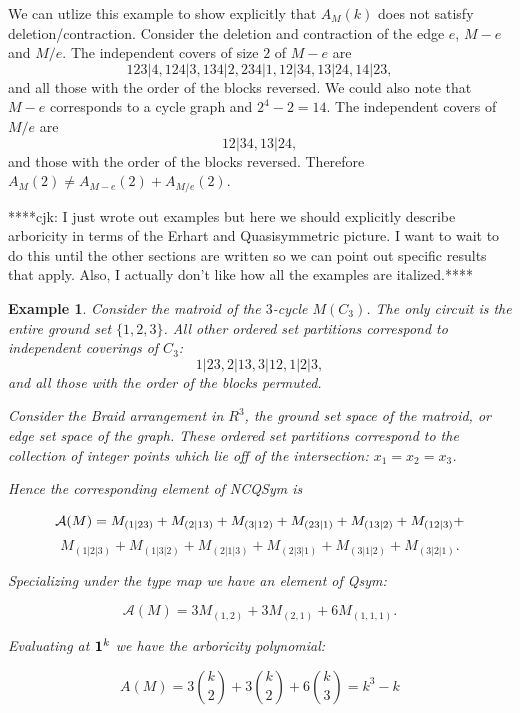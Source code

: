 \documentclass[12pt]{amsart}
\newtheorem{example}[definition]{Example}
\begin{document}
We can utlize this example to show explicitly that $A_M(k)$ does not
satisfy deletion/contraction.  Consider the deletion and contraction
of the edge $e$, $M-e$ and $M/e$.  The independent covers of size $2$
of $M-e$ are
$$ 123|4, 124|3, 134|2, 234|1, 12|34, 13|24, 14|23, $$ and all those
with the order of the blocks reversed.  We could also note that $M-e$
corresponds to a cycle graph and $2^4 - 2 = 14$.  The independent
covers of $M/e$ are $$12|34, 13|24,$$ and those with the order of the
blocks reversed.  Therefore $A_M(2) \neq A_{M-e}(2) + A_{M/e}(2)$.







****cjk: I just wrote out examples but here we should explicitly describe arboricity in terms of the Erhart and Quasisymmetric picture.  I want to wait to do this until the other sections are written so we can point out specific results that apply.  Also, I actually don't like how all the examples are italized.****


\begin{example}

Consider the matroid of the $3$-cycle $M(C_3)$.  The only circuit is the entire ground set $\{1,2,3\}$.  All other ordered set partitions correspond to independent coverings of $C_3$: 
$$1|23, 2|13, 3|12, 1|2|3,$$
and all those with the order of the blocks permuted. 

Consider the Braid arrangement in $R^3$, the ground set space of the
matroid, or edge set space of the graph.  These ordered set partitions
correspond to the collection of integer points which lie off of the
intersection: $x_1 = x_2 = x_3$.


 Hence the corresponding element of NCQSym is 

$${\bf{{\mathcal A}}}(M) = M_{(1|23)} + M_{(2|13)} + M_{(3|12)} + M_{(23|1)} + M_{(13|2)} +  M_{(12|3)} + $$ $$ M_{(1|2|3)} + M_{(1|3|2)}
+ M_{(2|1|3)} + M_{(2|3|1)} + M_{(3|1|2)} + M_{(3|2|1)}. $$

\noindent Specializing under the type map we have an element of Qsym:

$${\mathcal A}(M) = 3 M_{(1,2)} + 3 M_{(2,1)} + 6 M_{(1,1,1)}. $$

\noindent Evaluating at ${\bf 1}^k $ we have the arboricity polynomial:

$$ A(M) = 3 { k \choose 2} + 3 { k \choose 2} + 6 { k \choose 3} = k^3 - k $$

\end{example}



 

 
\end{document}
